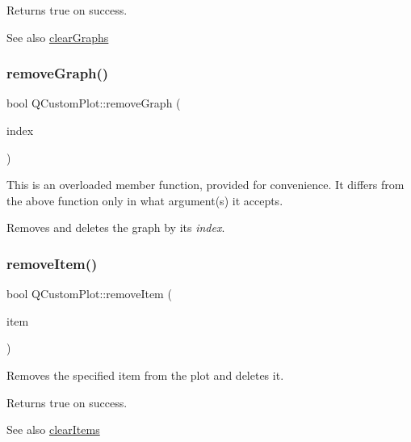 Returns true on success.

\begin{DoxySeeAlso}{See also}
\hyperlink{class_q_custom_plot_ab0f3abff2d2f7df3668b5836f39207fa}{clear\+Graphs} 
\end{DoxySeeAlso}
\mbox{\label{class_q_custom_plot_a9554b3d2d5b10c0f884bd4010b6c192c}} 
\subsubsection{\texorpdfstring{remove\+Graph()}{removeGraph()}\hspace{0.1cm}{\footnotesize\ttfamily [2/2]}}
{\footnotesize\ttfamily bool Q\+Custom\+Plot\+::remove\+Graph (\begin{DoxyParamCaption}\item[{int}]{index }\end{DoxyParamCaption})}

This is an overloaded member function, provided for convenience. It differs from the above function only in what argument(s) it accepts.

Removes and deletes the graph by its {\itshape index}. \mbox{\label{class_q_custom_plot_ae04446557292551e8fb6e2c106e1848d}} 
\subsubsection{\texorpdfstring{remove\+Item()}{removeItem()}\hspace{0.1cm}{\footnotesize\ttfamily [1/2]}}
{\footnotesize\ttfamily bool Q\+Custom\+Plot\+::remove\+Item (\begin{DoxyParamCaption}\item[{\hyperlink{class_q_c_p_abstract_item}{Q\+C\+P\+Abstract\+Item} $\ast$}]{item }\end{DoxyParamCaption})}

Removes the specified item from the plot and deletes it.

Returns true on success.

\begin{DoxySeeAlso}{See also}
\hyperlink{class_q_custom_plot_abdfd07d4f0591d0cf967f85013fd3645}{clear\+Items} 
\end{DoxySeeAlso}
\mbox{\label{class_q_custom_plot_abcfdda3d601c0441cab136137d715dea}} 
